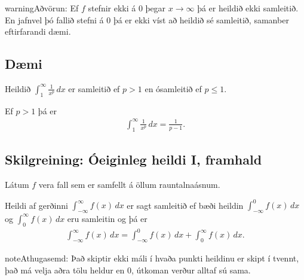 \documentclass[a4paper,10pt,icelandic]{sphinxmanual}
\begin{document}
\begin{sphinxadmonition}{warning}{Aðvörun:}
Ef \(f\) stefnir ekki á 0 þegar \(x\to \infty\) þá
er heildið ekki samleitið. En jafnvel þó fallið stefni á
0 þá er ekki víst að heildið sé samleitið, samanber
eftirfarandi dæmi.
\end{sphinxadmonition}


\subsection{Dæmi}
\label{\detokenize{kafli06:daemi}}
Heildið \(\int_1^\infty \frac{1}{x^p}\,dx\) er samleitið ef
\(p>1\) en ósamleitið ef \(p\leq 1\).

Ef \(p>1\) þá er
\begin{equation*}
\begin{split}\int_1^\infty \frac{1}{x^p}\,dx=\frac{1}{p-1}.\end{split}
\end{equation*}

\subsection{Skilgreining: Óeiginleg heildi I, framhald}
\label{\detokenize{kafli06:skilgreining-oeiginleg-heildi-i-framhald}}
Látum \(f\) vera fall sem er samfellt á öllum rauntalnaásnum.

Heildi af gerðinni \(\int_{-\infty}^\infty f(x)\,dx\) er sagt
samleitið ef bæði heildin \(\int_{-\infty}^0 f(x)\,dx\) og
\(\int_0^\infty f(x)\,dx\) eru samleitin og þá er
\begin{equation*}
\begin{split}\int_{-\infty}^\infty f(x)\,dx=\int_{-\infty}^0 f(x)\,dx +
  \int_0^\infty f(x)\,dx.\end{split}
\end{equation*}
\begin{sphinxadmonition}{note}{Athugasemd:}
Það skiptir ekki máli í hvaða punkti heildinu er skipt í tvennt, það má
velja aðra tölu heldur en 0, útkoman verður alltaf sú sama.
\end{sphinxadmonition}
\end{document}

